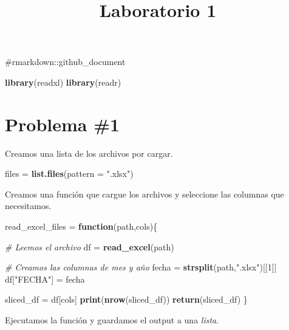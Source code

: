 \documentclass[
]{article}
\title{Laboratorio 1}
\author{}
\date{\vspace{-2.5em}}
\newenvironment{Shaded}{\begin{snugshade}}{\end{snugshade}}
\newcommand{\CommentTok}[1]{\textcolor[rgb]{0.56,0.35,0.01}{\textit{#1}}}
\newcommand{\ControlFlowTok}[1]{\textcolor[rgb]{0.13,0.29,0.53}{\textbf{#1}}}
\newcommand{\DataTypeTok}[1]{\textcolor[rgb]{0.13,0.29,0.53}{#1}}
\newcommand{\DecValTok}[1]{\textcolor[rgb]{0.00,0.00,0.81}{#1}}
\newcommand{\KeywordTok}[1]{\textcolor[rgb]{0.13,0.29,0.53}{\textbf{#1}}}
\newcommand{\NormalTok}[1]{#1}
\newcommand{\StringTok}[1]{\textcolor[rgb]{0.31,0.60,0.02}{#1}}
\begin{document}
\maketitle

\#rmarkdown::github\_document

\begin{Shaded}
\begin{Highlighting}[]
\KeywordTok{library}\NormalTok{(readxl)}
\KeywordTok{library}\NormalTok{(readr)}
\end{Highlighting}
\end{Shaded}

\hypertarget{problema-1}{%
\section{Problema \#1}\label{problema-1}}

Creamos una lista de los archivos por cargar.

\begin{Shaded}
\begin{Highlighting}[]
\NormalTok{files =}\StringTok{ }\KeywordTok{list.files}\NormalTok{(}\DataTypeTok{pattern =} \StringTok{".xlsx"}\NormalTok{)}
\end{Highlighting}
\end{Shaded}

Creamos una función que cargue los archivos y seleccione las columnas
que necesitamos.

\begin{Shaded}
\begin{Highlighting}[]
\NormalTok{read_excel_files =}\StringTok{ }\ControlFlowTok{function}\NormalTok{(path,cols)\{}

  \CommentTok{# Leemos el archivo}
\NormalTok{  df =}\StringTok{ }\KeywordTok{read_excel}\NormalTok{(path)}
  
  \CommentTok{# Creamos las columnas de mes y año}
\NormalTok{  fecha =}\StringTok{ }\KeywordTok{strsplit}\NormalTok{(path,}\StringTok{".xlsx"}\NormalTok{)[[}\DecValTok{1}\NormalTok{]]}
\NormalTok{  df[}\StringTok{"FECHA"}\NormalTok{] =}\StringTok{ }\NormalTok{fecha}
  
\NormalTok{  sliced_df =}\StringTok{ }\NormalTok{df[cols]}
  \KeywordTok{print}\NormalTok{(}\KeywordTok{nrow}\NormalTok{(sliced_df))}
  \KeywordTok{return}\NormalTok{(sliced_df)}
\NormalTok{\}}
\end{Highlighting}
\end{Shaded}

Ejecutamos la función y guardamos el output a una \emph{lista}.
\end{document}
